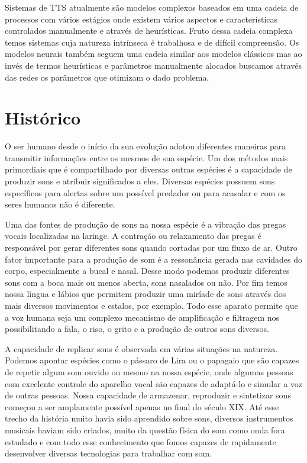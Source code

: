 Sistemas de TTS atualmente são modelos complexos baseados em uma cadeia de processos com vários estágios onde existem vários aspectos e características controlados manualmente e através de heurísticas. Fruto dessa cadeia complexa temos sistemas cuja natureza intrínseca é trabalhosa e de difícil compreensão. Os modelos neurais também seguem uma cadeia similar aos modelos clássicos mas ao invés de termos heurísticas e parâmetros manualmente alocados buscamos através das redes os parâmetros que otimizam o dado problema.

\section{Histórico}
O ser humano desde o início da sua evolução adotou diferentes maneiras para transmitir informações entre os mesmos de sua espécie. Um dos métodos mais primordiais que é compartilhado por diversas outras espécies é a capacidade de produzir sons e atribuir significados a eles. Diversas espécies possuem sons específicos para alertas sobre um possível predador ou para acasalar e com os seres humanos não é diferente.

Uma das fontes de produção de sons na nossa espécie é a vibração das pregas vocais localizadas na laringe. A contração ou relaxamento das pregas é responsável por gerar diferentes sons quando cortadas por um fluxo de ar. Outro fator importante para a produção de som é a ressonância gerada nas cavidades do corpo, especialmente a bucal e nasal. Desse modo podemos produzir diferentes sons com a boca mais ou menos aberta, sons nasalados ou não. Por fim temos nossa língua e lábios que permitem produzir uma miríade de sons através dos mais diversos movimentos e estalos, por exemplo. Todo esse aparato permite que a voz humana seja um complexo mecanismo de amplificação e filtragem nos possibilitando a fala, o riso, o grito e a produção de outros sons diversos.

A capacidade de replicar sons é observada em várias situações na natureza. Podemos apontar espécies como o pássaro de Lira ou o papagaio que são capazes de repetir algum som ouvido ou mesmo na nossa espécie, onde algumas pessoas com excelente controle do aparelho vocal são capazes de adaptá-lo e simular a voz de outras pessoas. Nossa capacidade de armazenar, reproduzir e sintetizar sons começou a ser amplamente possível apenas no final do século XIX. Até esse trecho da história muito havia sido aprendido sobre sons, diversos instrumentos musicais haviam sido criados, muito da questão física do som como onda fora estudado e com todo esse conhecimento que fomos capazes de rapidamente desenvolver diversas tecnologias para trabalhar com som.

